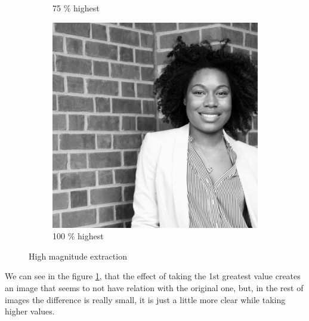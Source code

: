 \begin{figure}[h!]
\begin{subfigure}{0.2\textwidth}
  \caption{75 \% highest}
\end{subfigure}%
\begin{subfigure}{0.2\textwidth}
  \centering
  \includegraphics[width=0.95\linewidth]{output/magnitud_high_100}
  \caption{100 \% highest}
\end{subfigure}%
 \caption{High magnitude extraction}
\label{fig:high-magnitude}
\end{figure}

We can see in the figure \ref{fig:high-magnitude}, that the effect of taking the 1st greatest value creates an image that seems to not have relation with the original one, but, in the rest of images the difference is really small, it is just a little more clear while taking higher values.

